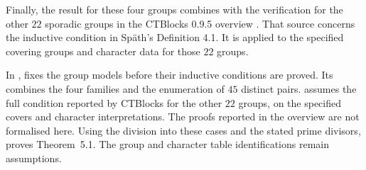 \begingroup{}
Finally, the result for these four groups combines with the verification for
the other $22$ sporadic groups in the CTBlocks 0.9.5 overview
\cite{BreuerSporadicOverview}. That source concerns the inductive condition
in Sp\"ath's Definition 4.1. It is applied to the specified covering groups
and character data for those $22$ groups.
\par\endgroup

\begin{implementation}
In ,
 fixes the group models before their inductive
conditions are proved. Its  combines the four
families and the enumeration of $45$ distinct pairs.
 assumes the full condition
reported by CTBlocks for the other $22$ groups, on the specified covers
and character interpretations. The proofs reported in the overview are
not formalised here. Using the division into these cases and the stated prime
divisors,  proves Theorem~5.1. The group and
character table identifications remain assumptions.
\end{implementation}
